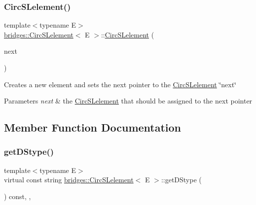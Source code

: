 \subsubsection{\texorpdfstring{Circ\+S\+Lelement()}{CircSLelement()}\hspace{0.1cm}{\footnotesize\ttfamily [8/8]}}
{\footnotesize\ttfamily template$<$typename E$>$ \\
\mbox{\hyperlink{classbridges_1_1_circ_s_lelement}{bridges\+::\+Circ\+S\+Lelement}}$<$ E $>$\+::\mbox{\hyperlink{classbridges_1_1_circ_s_lelement}{Circ\+S\+Lelement}} (\begin{DoxyParamCaption}\item[{\mbox{\hyperlink{classbridges_1_1_circ_s_lelement}{Circ\+S\+Lelement}}$<$ E $>$ $\ast$}]{next }\end{DoxyParamCaption})\hspace{0.3cm}{\ttfamily [inline]}}

Creates a new element and sets the next pointer to the \mbox{\hyperlink{classbridges_1_1_circ_s_lelement}{Circ\+S\+Lelement}} \char`\"{}next\char`\"{} 
\begin{DoxyParams}{Parameters}
{\em next} & the \mbox{\hyperlink{classbridges_1_1_circ_s_lelement}{Circ\+S\+Lelement}} that should be assigned to the next pointer \\
\hline
\end{DoxyParams}


\subsection{Member Function Documentation}
\mbox{\label{classbridges_1_1_circ_s_lelement_a4b27c205af46162371e3ffe05cbbe3d5}} 
\subsubsection{\texorpdfstring{get\+D\+Stype()}{getDStype()}\hspace{0.1cm}{\footnotesize\ttfamily [1/2]}}
{\footnotesize\ttfamily template$<$typename E$>$ \\
virtual const string \mbox{\hyperlink{classbridges_1_1_circ_s_lelement}{bridges\+::\+Circ\+S\+Lelement}}$<$ E $>$\+::get\+D\+Stype (\begin{DoxyParamCaption}{ }\end{DoxyParamCaption}) const\hspace{0.3cm}{\ttfamily [inline]}, {\ttfamily [override]}, {\ttfamily [virtual]}}

